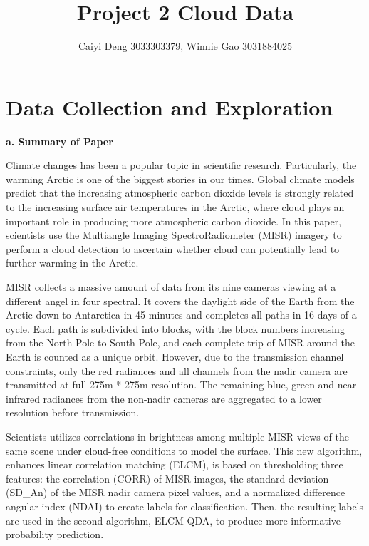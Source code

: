 \documentclass[11pt]{article}
\title{Project 2 Cloud Data}
\author {Caiyi Deng 3033303379, Winnie Gao 3031884025}
\begin{document}


\maketitle

\section{Data Collection and Exploration}

\vspace{0.2cm}
\textbf{a. Summary of Paper}

Climate changes has been a popular topic in scientific research. Particularly, the warming Arctic is one of the biggest stories in our times. Global climate models predict that the increasing atmospheric carbon dioxide levels is strongly related to the increasing surface air temperatures in the Arctic, where cloud plays an important role in producing more atmospheric carbon dioxide. In this paper, scientists use the Multiangle Imaging SpectroRadiometer (MISR) imagery to perform a cloud detection to ascertain whether cloud can potentially lead to further warming in the Arctic.

MISR collects a massive amount of data from its nine cameras viewing at a different angel in four spectral. It covers the daylight side of the Earth from the Arctic down to Antarctica in 45 minutes and completes all paths in 16 days of a cycle. Each path is subdivided into blocks, with the block numbers increasing from the North Pole to South Pole, and each complete trip of MISR around the Earth is counted as a unique orbit. However, due to the transmission channel constraints, only the red radiances and all channels from the nadir camera are transmitted at full 275m * 275m resolution. The remaining blue, green and near-infrared radiances from the non-nadir cameras are aggregated to a lower resolution before transmission. 

Scientists utilizes correlations in brightness among multiple MISR views of the same scene under cloud-free conditions to model the surface. This new algorithm, enhances linear correlation matching (ELCM), is based on thresholding three features: the correlation (CORR) of MISR images, the standard deviation (SD\_An) of the MISR nadir camera pixel values, and a normalized difference angular index (NDAI) to create labels for classification. Then, the resulting labels are used in the second algorithm, ELCM-QDA, to produce more informative probability prediction. 
\end{document}
